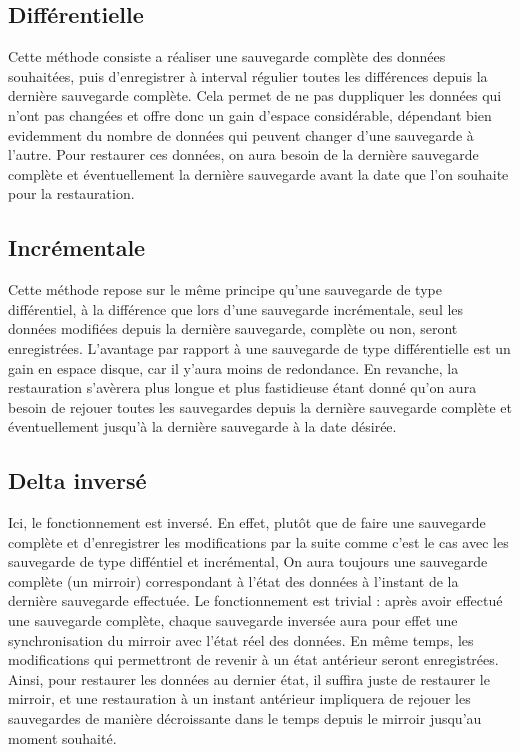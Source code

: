 \documentclass[a4paper,11pt]{report}
\begin{document}
\subsection{Différentielle}
Cette méthode consiste a réaliser une sauvegarde complète des données souhaitées, puis d'enregistrer à interval régulier toutes les différences depuis la dernière sauvegarde complète.
Cela permet de ne pas duppliquer les données qui n'ont pas changées et offre donc un gain d'espace considérable, dépendant bien evidemment du nombre de données qui peuvent changer d'une sauvegarde à l'autre.
Pour restaurer ces données, on aura besoin de la dernière sauvegarde complète et éventuellement la dernière sauvegarde avant la date que l'on souhaite pour la restauration.

\subsection{Incrémentale}
Cette méthode repose sur le même principe qu'une sauvegarde de type différentiel, à la différence que lors d'une sauvegarde incrémentale, seul les données modifiées depuis la dernière sauvegarde, complète ou non, seront enregistrées.
L'avantage par rapport à une sauvegarde de type différentielle est un gain en espace disque, car il y'aura moins de redondance. En revanche, la restauration s'avèrera plus longue et plus fastidieuse étant donné qu'on aura besoin de rejouer toutes les sauvegardes depuis la dernière sauvegarde complète et éventuellement jusqu'à la dernière sauvegarde à la date désirée.

\subsection{Delta inversé}
Ici, le fonctionnement est inversé.
En effet, plutôt que de faire une sauvegarde complète et d'enregistrer les modifications par la suite comme c'est le cas avec les sauvegarde de type difféntiel et incrémental, On aura toujours une sauvegarde complète (un mirroir) correspondant à l'état des données à l'instant de la dernière sauvegarde effectuée.
Le fonctionnement est trivial : après avoir effectué une sauvegarde complète, chaque sauvegarde inversée aura pour effet une synchronisation du mirroir avec l'état réel des données. En même temps, les modifications qui permettront de revenir à un état antérieur seront enregistrées.
Ainsi, pour restaurer les données au dernier état, il suffira juste de restaurer le mirroir, et une restauration à un instant antérieur impliquera de rejouer les sauvegardes de manière décroissante dans le temps depuis le mirroir jusqu'au moment souhaité.
\end{document}

